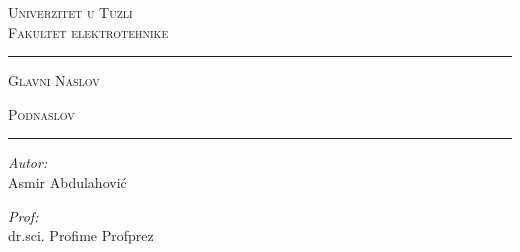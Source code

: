 \documentclass[12pt,a4paper]{report}
\begin{document}
\begin{titlepage}
\newcommand\myhlinewotikz{\noindent\rule[.35em]{0.95\linewidth}{.4pt}\par}
\center

\begin{flushleft} \large
\textsc{\Large{Univerzitet u Tuzli\\Fakultet elektrotehnike}}
\end{flushleft}

\myhlinewotikz
\textsc{\LARGE{Glavni Naslov}}\par
\vspace{3mm}
\textsc{\LARGE{Podnaslov}}\par
\myhlinewotikz

\noindent
\begin{minipage}{0.5\textwidth}
\begin{flushleft} \large
\emph{Autor:}\\
Asmir Abdulahović
\end{flushleft}
\end{minipage}%
\begin{minipage}{0.5\textwidth}
\begin{flushright} \large
\emph{Prof:} \\
dr.sci. Profime Profprez
\end{flushright}
\end{minipage}

\end{titlepage}
\end{document}

